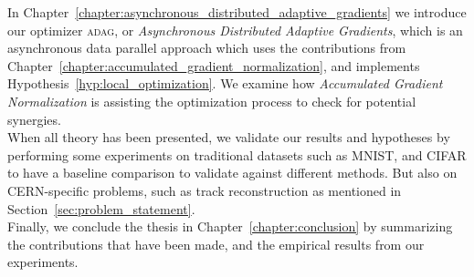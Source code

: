 In Chapter~\ref{chapter:asynchronous_distributed_adaptive_gradients} we introduce our optimizer \textsc{adag}, or \emph{Asynchronous Distributed Adaptive Gradients}, which is an asynchronous data parallel approach which uses the contributions from Chapter~\ref{chapter:accumulated_gradient_normalization}, and implements Hypothesis~\ref{hyp:local_optimization}. We examine how \emph{Accumulated Gradient Normalization} is assisting the optimization process to check for potential synergies.\\

When all theory has been presented, we validate our results and hypotheses by performing some experiments on traditional datasets such as MNIST, and CIFAR to have a baseline comparison to validate against different methods. But also on CERN-specific problems, such as track reconstruction as mentioned in Section~\ref{sec:problem_statement}.\\

Finally, we conclude the thesis in Chapter~\ref{chapter:conclusion} by summarizing the contributions that have been made, and the empirical results from our experiments.
